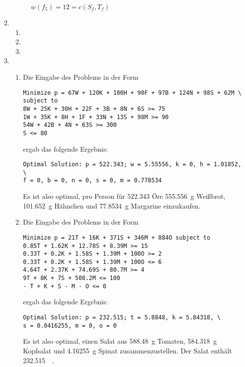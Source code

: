 \documentclass[a4paper]{scrartcl}
\begin{document}
\begin{enumerate}[label=\bfseries\arabic*.]
\begin{figure}[h]
            \caption{$w(f_5) = 12 = c(S_f, T_f)$}
            \label{fig:ek5}
        \end{figure}

        \FloatBarrier

    \item
        \begin{enumerate}
            \item

            \item

            \item

        \end{enumerate}

    \item
        \begin{enumerate}
            \item
                Die Eingabe des Problems in der Form
                \begin{verbatim}
Minimize p = 67W + 120K + 100H + 90F + 97B + 124N + 98S + 62M \
subject to
8W + 25K + 30H + 22F + 3B + 8N + 6S >= 75
1W + 35K + 8H + 1F + 33N + 13S + 98M >= 90
54W + 42B + 4N + 63S >= 300
S <= 80 \end{verbatim}
                ergab das folgende Ergebnis:
                \begin{verbatim}
Optimal Solution: p = 522.343; w = 5.55556, k = 0, h = 1.01852, \
f = 0, b = 0, n = 0, s = 0, m = 0.778534 \end{verbatim}
                Es ist also optimal, pro Person für $522.343$ Öre
                \SI{555,556}{\gram} Weißbrot, \SI{101,652}{\gram} Hähnchen
                und \SI{77,8534}{\gram} Margarine einzukaufen.

            \item
                Die Eingabe des Problems in der Form
                \begin{verbatim}
Minimize p = 21T + 16K + 371S + 346M + 884O subject to
0.85T + 1.62K + 12.78S + 8.39M >= 15
0.33T + 0.2K + 1.58S + 1.39M + 100O >= 2
0.33T + 0.2K + 1.58S + 1.39M + 100O <= 6
4.64T + 2.37K + 74.69S + 80.7M >= 4
9T + 8K + 7S + 508.2M <= 100
- T + K + S - M - O <= 0 \end{verbatim}
                ergab das folgende Ergebnis:
                \begin{verbatim}
Optimal Solution: p = 232.515; t = 5.8848, k = 5.84318, \
s = 0.0416255, m = 0, o = 0 \end{verbatim}
                Es ist also optimal, einen Salat aus \SI{588,48}{\gram} Tomaten,
                \SI{584,318}{\gram} Kopfsalat und \SI{4,16255}{\gram} Spinat
                zusammenzustellen.
                Der Salat enthält \SI{232,515}{\kilo\calorie}.


\end{enumerate}
\end{enumerate}
\end{document}
